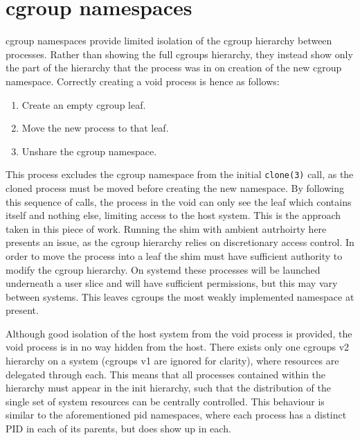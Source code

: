 \documentclass[12pt,a4paper,twoside]{report}
\begin{document}
\section{cgroup namespaces}
\label{sec:voiding-cgroup}

cgroup namespaces provide limited isolation of the cgroup hierarchy between processes. Rather than showing the full cgroups hierarchy, they instead show only the part of the hierarchy that the process was in on creation of the new cgroup namespace. Correctly creating a void process is hence as follows:

\begin{enumerate}
    \item Create an empty cgroup leaf.
    \item Move the new process to that leaf.
    \item Unshare the cgroup namespace.
\end{enumerate}

This process excludes the cgroup namespace from the initial \texttt{clone(3)} call, as the cloned process must be moved before creating the new namespace. By following this sequence of calls, the process in the void can only see the leaf which contains itself and nothing else, limiting access to the host system.  This is the approach taken in this piece of work. Running the shim with ambient autrhoirty here presents an issue, as the cgroup hierarchy relies on discretionary access control. In order to move the process into a leaf the shim must have sufficient authority to modify the cgroup hierarchy. On systemd these processes will be launched underneath a user slice and will have sufficient permissions, but this may vary between systems. This leaves cgroups the most weakly implemented namespace at present.

Although good isolation of the host system from the void process is provided, the void process is in no way hidden from the host. There exists only one cgroups v2 hierarchy on a system (cgroups v1 are ignored for clarity), where resources are delegated through each. This means that all processes contained within the hierarchy must appear in the init hierarchy, such that the distribution of the single set of system resources can be centrally controlled. This behaviour is similar to the aforementioned pid namespaces, where each process has a distinct PID in each of its parents, but does show up in each.
\end{document}
